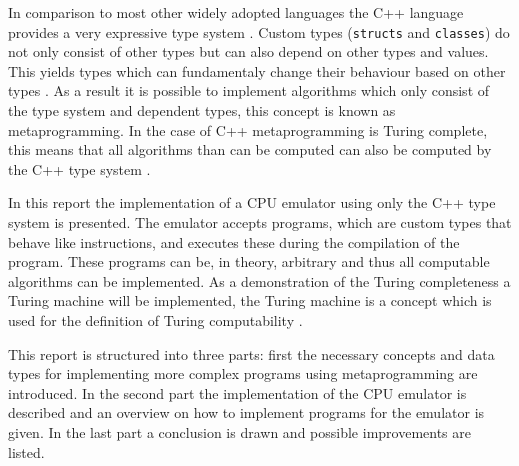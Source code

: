 

In comparison to most other widely adopted languages the C++ language provides a very expressive type system \cite{concepts05}. Custom
types (\lstinline{structs} and \lstinline{classes}) do not only consist of other types but can also depend on other
types and values. This yields types which can fundamentaly change their behaviour based on other types \cite[Chapter~13.3]{std}. As a result
it is possible to implement algorithms which only consist of the type system and dependent types, this concept is known
as metaprogramming. In the case of C++ metaprogramming is Turing complete, this means that all algorithms than
can be computed can also be computed by the C++ type system \cite{TuringComputability}.

In this report the implementation of a CPU emulator using only the C++ type system is presented. The emulator
accepts programs, which are custom types that behave like instructions, and executes these during the compilation of
the program. These programs can be, in theory, arbitrary and thus all computable algorithms can be implemented. As a
demonstration of the Turing completeness a Turing machine will be implemented, the Turing machine is a concept which
is used for the definition of Turing computability \cite{Turing1936}.

This report is structured into three parts: first the necessary concepts and data types for implementing more complex 
programs using metaprogramming are introduced. In the second part the implementation of the CPU emulator is described
and an overview on how to implement programs for the emulator is given. In the last part a conclusion is drawn and
possible improvements are listed.
